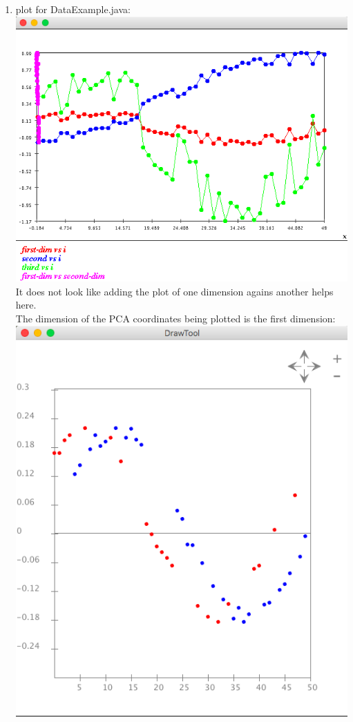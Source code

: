\documentclass{article}
\begin{document}
\begin{enumerate}
\item plot for DataExample.java: \\
\includegraphics[scale=0.3]{exercise13_original}\\
It does not look like adding the plot of one dimension agains another helps here. \\
The dimension of the PCA coordinates being plotted is the first dimension:\\
\includegraphics[scale=0.3]{exercise13_pca}


\end{enumerate}
\end{document}
